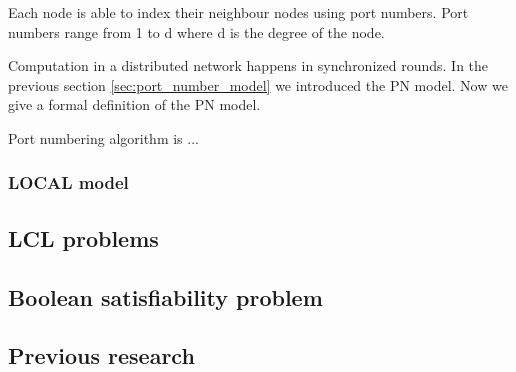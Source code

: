 Each node is able to index their neighbour nodes using port numbers.
Port numbers range from 1 to d where d is the degree of the node.

Computation in a distributed network happens in synchronized rounds.
In the previous section \ref{sec:port_number_model} we introduced the PN model.
Now we give a formal definition of the PN model.


Port numbering algorithm is ...



\subsubsection{LOCAL model} \label{sec:local_model}

\subsection{LCL problems} \label{sec:lcl_problems}

\subsection{Boolean satisfiability problem}

\subsection{Previous research} \label{sec:previous_research}


\clearpage

